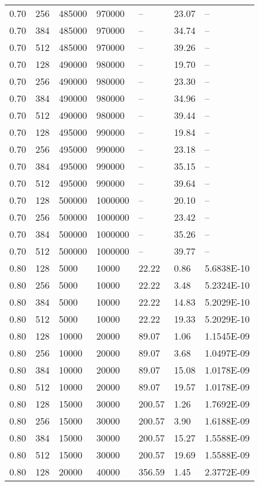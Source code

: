 \begin{tabular}{l|l|l|l|l|l|l}
0.70 & 256 & 485000 & 970000 & -- & 23.07 & --\\
0.70 & 384 & 485000 & 970000 & -- & 34.74 & --\\
0.70 & 512 & 485000 & 970000 & -- & 39.26 & --\\
0.70 & 128 & 490000 & 980000 & -- & 19.70 & --\\
0.70 & 256 & 490000 & 980000 & -- & 23.30 & --\\
0.70 & 384 & 490000 & 980000 & -- & 34.96 & --\\
0.70 & 512 & 490000 & 980000 & -- & 39.44 & --\\
0.70 & 128 & 495000 & 990000 & -- & 19.84 & --\\
0.70 & 256 & 495000 & 990000 & -- & 23.18 & --\\
0.70 & 384 & 495000 & 990000 & -- & 35.15 & --\\
0.70 & 512 & 495000 & 990000 & -- & 39.64 & --\\
0.70 & 128 & 500000 & 1000000 & -- & 20.10 & --\\
0.70 & 256 & 500000 & 1000000 & -- & 23.42 & --\\
0.70 & 384 & 500000 & 1000000 & -- & 35.26 & --\\
0.70 & 512 & 500000 & 1000000 & -- & 39.77 & --\\
\hline0.80 & 128 &   5000 &  10000 & 22.22 &  0.86 & 5.6838E-10\\
0.80 & 256 &   5000 &  10000 & 22.22 &  3.48 & 5.2324E-10\\
0.80 & 384 &   5000 &  10000 & 22.22 & 14.83 & 5.2029E-10\\
0.80 & 512 &   5000 &  10000 & 22.22 & 19.33 & 5.2029E-10\\
0.80 & 128 &  10000 &  20000 & 89.07 &  1.06 & 1.1545E-09\\
0.80 & 256 &  10000 &  20000 & 89.07 &  3.68 & 1.0497E-09\\
0.80 & 384 &  10000 &  20000 & 89.07 & 15.08 & 1.0178E-09\\
0.80 & 512 &  10000 &  20000 & 89.07 & 19.57 & 1.0178E-09\\
0.80 & 128 &  15000 &  30000 & 200.57 &  1.26 & 1.7692E-09\\
0.80 & 256 &  15000 &  30000 & 200.57 &  3.90 & 1.6188E-09\\
0.80 & 384 &  15000 &  30000 & 200.57 & 15.27 & 1.5588E-09\\
0.80 & 512 &  15000 &  30000 & 200.57 & 19.69 & 1.5588E-09\\
0.80 & 128 &  20000 &  40000 & 356.59 &  1.45 & 2.3772E-09\\

\end{tabular}
